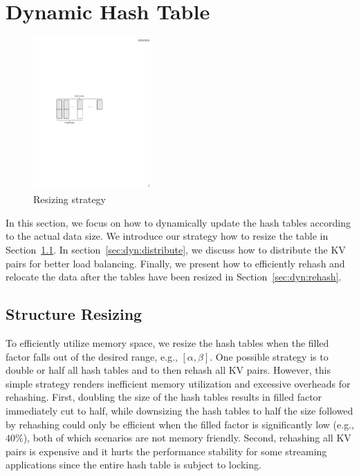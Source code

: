 \section{Dynamic Hash Table}\label{sec:dyn}
\begin{figure}[t]
\centering
\includegraphics[width=0.4\textwidth]{fig/MultiTable.pdf}
\caption{Resizing strategy}
\label{fig:resize}
\end{figure}

In this section, we focus on how to dynamically update the hash tables according to the actual data size. 
We introduce our strategy how to resize the table in Section~\ref{sec:dyn:resize}.
In section~\ref{sec:dyn:distribute}, we discuss how to distribute the KV pairs for better load balancing. 
Finally, we present how to efficiently rehash and relocate the data after the tables have been resized in Section~\ref{sec:dyn:rehash}. 

\subsection{Structure Resizing}\label{sec:dyn:resize}
To efficiently utilize memory space, we resize the hash tables when the filled factor falls out of the desired range, e.g., $[\alpha,\beta]$.
One possible strategy is to double or half all hash tables and to then rehash all KV pairs. However, this simple strategy renders inefficient memory utilization and 
excessive overheads for rehashing. First, doubling the size of the hash tables results in filled factor immediately cut to half, while downsizing the hash tables to half the size followed by rehashing could only be efficient when the filled factor is significantly low (e.g., $40\%$), both of which scenarios are not memory friendly. Second, rehashing all KV pairs is expensive and it hurts the performance stability for some streaming applications since the entire hash table is subject to locking. 

